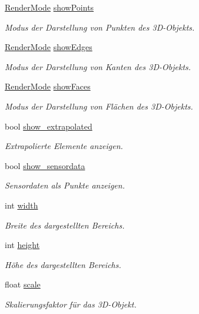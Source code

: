 \begin{DoxyCompactItemize}
\hyperlink{classRenderer_aa9844470f59e9fdf3aed088936100863}{Render\-Mode} \hyperlink{structRenderer_1_1Viewport__info_ab95af83b6e3e068e14b37187a11709b7}{show\-Points}
\begin{DoxyCompactList}\small\item\em Modus der Darstellung von Punkten des 3\-D-\/\-Objekts. \end{DoxyCompactList}\item 
\hyperlink{classRenderer_aa9844470f59e9fdf3aed088936100863}{Render\-Mode} \hyperlink{structRenderer_1_1Viewport__info_a61ce4c293d9dc97da9b4ed2f8f7a36e0}{show\-Edges}
\begin{DoxyCompactList}\small\item\em Modus der Darstellung von Kanten des 3\-D-\/\-Objekts. \end{DoxyCompactList}\item 
\hyperlink{classRenderer_aa9844470f59e9fdf3aed088936100863}{Render\-Mode} \hyperlink{structRenderer_1_1Viewport__info_aa1f3f4b18210cf0bc69df0c9015e8acf}{show\-Faces}
\begin{DoxyCompactList}\small\item\em Modus der Darstellung von Flächen des 3\-D-\/\-Objekts. \end{DoxyCompactList}\item 
bool \hyperlink{structRenderer_1_1Viewport__info_ac9d99216a6044d7048ba805f9f9b0815}{show\-\_\-extrapolated}
\begin{DoxyCompactList}\small\item\em Extrapolierte Elemente anzeigen. \end{DoxyCompactList}\item 
bool \hyperlink{structRenderer_1_1Viewport__info_abd0ab0f20c5acc43128634b4b4cc1f52}{show\-\_\-sensordata}
\begin{DoxyCompactList}\small\item\em Sensordaten als Punkte anzeigen. \end{DoxyCompactList}\item 
int \hyperlink{structRenderer_1_1Viewport__info_af0617337cfe95f9d5a21420335474bea}{width}
\begin{DoxyCompactList}\small\item\em Breite des dargestellten Bereichs. \end{DoxyCompactList}\item 
int \hyperlink{structRenderer_1_1Viewport__info_acd3f381981791f2b012129fe54aee39c}{height}
\begin{DoxyCompactList}\small\item\em Höhe des dargestellten Bereichs. \end{DoxyCompactList}\item 
float \hyperlink{structRenderer_1_1Viewport__info_a90128db9d24987d94ddd843646a4f03d}{scale}
\begin{DoxyCompactList}\small\item\em Skalierungsfaktor für das 3\-D-\/\-Objekt. \end{DoxyCompactList}\end{DoxyCompactItemize}


